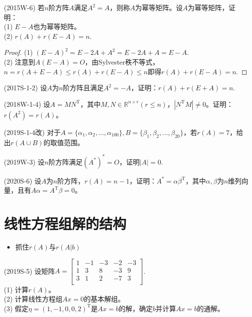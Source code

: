 \documentclass[lang=cn,newtx,10pt,scheme=chinese]{elegantbook}
\begin{document}
\begin{example}
    (2015W-6) 若$n$阶方阵$A$满足$A^2=A$，则称$A$为幂等矩阵。设$A$为幂等矩阵，证明：\\
    (1) $E - A$也为幂等矩阵。\\
    (2) $r(A) + r(E - A) = n$.
\end{example}

\begin{proof}
    (1) $(E - A)^2 = E - 2A + A^2 = E - 2A + A = E - A$. \\
    (2) 注意到$A(E - A) = O$，由Sylvester秩不等式，$ n = r(A + E - A) \le r(A) + r(E - A) \le n$即得$r(A) + r(E - A) = n$.
\end{proof}

\begin{exercise}
    (2017S-1-2) 设$A$为$n$阶方阵且满足$A^2 = -A$，证明：$r(A) + r(E + A) = n$.
\end{exercise}

\begin{exercise}
    (2018W-1-4) 设$A = M N^\mathrm{T}$，其中$M,N \in \mathbb{R}^{n \times r}(r \le n)$，$\left|N^\mathrm{T} M\right| \neq 0$。证明：$r(A^2) = r(A)$。
\end{exercise}

\begin{exercise}
    (2019S-1-4改) 对于$A = \{ \alpha_1,\alpha_2,\dots,\alpha_{100}\},B = \{\beta_1,\beta_2,\dots,\beta_{20}\}$，若$r(A) = 7$，给出$r(A \cup B)$的取值范围。
\end{exercise}

\begin{exercise}
    (2019W-3) 设$n$阶方阵满足$(A^*)^* = O$，证明$\left|A\right| = 0$.
\end{exercise}

\begin{exercise}
    (2020S-6) 设$A$为$n$阶方阵，$r(A) = n-1$，证明：$A^* = \alpha \beta^\mathrm{T}$，其中$\alpha,\beta$为$n$维列向量，且有$A \alpha = A^\mathrm{T} \beta = 0$。 
\end{exercise}

\section{线性方程组解的结构}

\begin{itemize}
    \item 抓住$r(A)$与$r(A | b)$
\end{itemize}

\begin{exercise}
    (2019S-5) 设矩阵$A=
    \left[
    \begin{matrix}
        1 & -1 & -3 & -2 & -3 \\
        1 & 3 & 8 & -3 & 9 \\
        3 & 1 & 2 & -7 & 3 \\
    \end{matrix}
    \right]
    $.\\
    (1) 计算$r(A)$。\\
    (2) 计算线性方程组$Ax = 0$的基本解组。\\
    (3) 假定$\eta = (1,-1,0,0,2)^\mathrm{T}$是$Ax=b$的解，确定$b$并计算$Ax=b$的通解。
\end{exercise}
\end{document}
